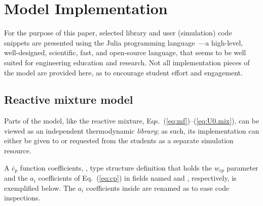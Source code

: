 
\section{Model Implementation}

    For the  purpose  of  this  paper,  selected  library  and  user  (simulation)  code  snippets  are  presented  using  the  Julia  programming  language~\cite{2012-BezansonJ+EdelmanA-CoRR,
    2017-BezansonJ+ShahVB-SIAMRev}---a high-level, well-designed, scientific, fast, and open-source language, that seems to be well suited for  engineering  education  and  research.  Not  all
    implementation pieces of the model are provided here, as to encourage student effort and engagement.

    \subsection{Reactive mixture model}

    Parts of the model, like the reactive mixture, Eqs.~(\ref{eq:mf})--(\ref{eq:U0.mix}), can be viewed as an independent thermodynamic \emph{library}; as such, its implementation  can  either
    be given to or requested from the students as a separate simulation resource.

    A $\bar{c}_p$ function coefficients, , type structure definition that holds the $w_{cp}$ parameter and the $a_i$ coefficients of Eq.~(\ref{eq:cp}) in  fields  named  
    and , respectively, is exemplified below. The $a_i$ coefficients inside  are renamed as to ease code inspections.


